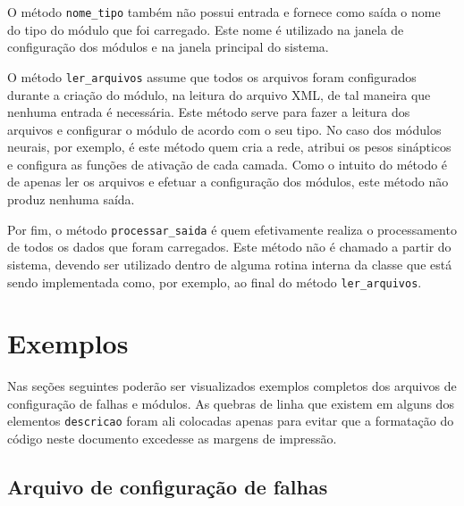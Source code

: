O método \verb|nome_tipo| também não possui entrada e fornece como saída o nome
do tipo do módulo que foi carregado. Este nome é utilizado na janela de
configuração dos módulos e na janela principal do sistema.

O método \verb|ler_arquivos| assume que todos os arquivos foram configurados
durante a criação do módulo, na leitura do arquivo XML, de tal maneira que
nenhuma entrada é necessária. Este método serve para fazer a leitura dos
arquivos e configurar o módulo de acordo com o seu tipo. No caso dos módulos
neurais, por exemplo, é este método quem cria a rede, atribui os pesos
sinápticos e configura as funções de ativação de cada camada. Como o intuito do
método é de apenas ler os arquivos e efetuar a configuração dos módulos, este
método não produz nenhuma saída.

Por fim, o método \verb|processar_saida| é quem efetivamente realiza o
processamento de todos os dados que foram carregados. Este método não é chamado
a partir do sistema, devendo ser utilizado dentro de alguma rotina interna da
classe que está sendo implementada como, por exemplo, ao final do método
\verb|ler_arquivos|.

\section{Exemplos}
Nas seções seguintes poderão ser visualizados exemplos completos dos arquivos de
configuração de falhas e módulos. As quebras de linha que existem em alguns
dos elementos \verb|descricao| foram ali colocadas apenas para evitar que a
formatação do código neste documento excedesse as margens de impressão.

\subsection{Arquivo de configuração de falhas}
\inputminted[fontsize = \footnotesize,
             bgcolor = cinzaclaro,
             linenos = true,
             samepage = false,
             firstline = 1,
             firstnumber = 1,
             lastline = 48]{xml}{codigos/falhas.sdd}

\inputminted[fontsize = \footnotesize,
             bgcolor = cinzaclaro,
             linenos = true,
             samepage = false,
             firstline = 49,
             firstnumber = 49,
             lastline = 72]{xml}{codigos/falhas.sdd}

